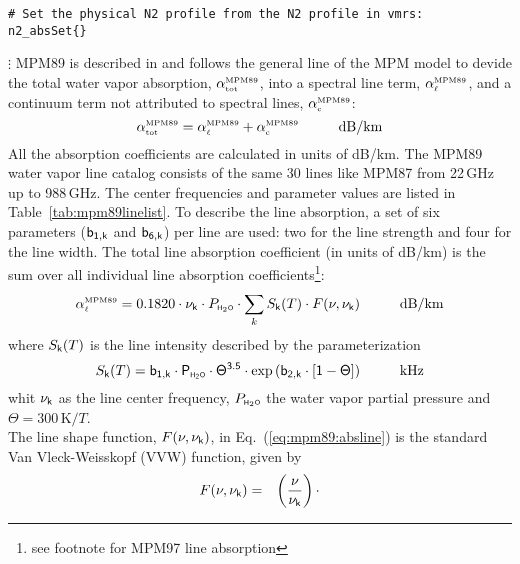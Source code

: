 {\begin{verbatim}
# Set the physical N2 profile from the N2 profile in vmrs:
n2_absSet{}
\end{verbatim}
$\vdots$
%
%
%
% 
\label{leveld:mpm89}
%
MPM89 is described in \cite{liebe:89} and follows the general line 
of the MPM model to devide the total water vapor absorption, 
$\alpha^{\mbox{\rm \tiny MPM89}}_{\mbox{\tiny tot}}$, into a spectral line term, $\alpha^{\mbox{\rm \tiny MPM89}}_{\mbox{\tiny $\ell$}}$, and a continuum 
term not attributed to spectral lines, $\alpha^{\mbox{\rm \tiny MPM89}}_{\mbox{\tiny c}}$:
\begin{equation}
  \label{eq:mpm89_abs}
  \alphampmmtot = \alphampmml + \alphampmmc\hspace*{10mm}\mbox{dB/km}
\end{equation}
All the absorption coefficients are calculated in units of \mbox{dB/km}.
%
%
\label{levele:h2o_mpm89_lines}
The MPM89 water vapor line catalog consists of the same 30 lines 
like MPM87 from 22\,GHz up to 988\,GHz. The center frequencies and parameter 
values are listed in Table~\ref{tab:mpm89linelist}. To describe the line 
absorption, a set of six parameters ($\sf b_{\sf 1,k}$ and $\sf b_{\sf 6,k}$) per line are used: two 
for the line strength and four for the line width. The total line 
absorption coefficient (in units of dB/km) is the sum over all
individual line absorption coefficients\footnote{see footnote for
  MPM97 line absorption}:
\begin{equation}
  \label{eq:mpm89:absline}
  \alphampmml = 0.1820 \cdot \nuk \cdot \phzo \cdot 
  \sum_{k}{\inten \cdot \shape}\hspace*{10mm}\mbox{dB/km}
\end{equation}
where $S_{\sf k}(T)$ is the line intensity described by the parameterization
\begin{equation}
  \label{eq:mpm89:strength}
  \inten = \bek \cdot \phzo \cdot \Theta^{3.5} 
           \cdot \exp{(\bzk \cdot [1-\Theta])}\hspace*{10mm}\mbox{kHz}
\end{equation}
whit $\nu_{\sf k}$ as the line center frequency, $P_{\mbox{\tiny \sf H}_{2}\mbox{\tiny \sf O}}$ the water
vapor partial pressure and $\Theta = 300\,\mbox{K}/T$.\\
The line shape function, $F(\nu,\nu_{\sf k})$, in Eq.~(\ref{eq:mpm89:absline}) 
is the standard Van Vleck-Weisskopf (VVW) function, given by 
\begin{eqnarray}
  \label{eq:mpm89:VVW}
  \shape & = & \left(\frac{\nu}{\nuk}\right) \cdot 

\end{eqnarray}}
